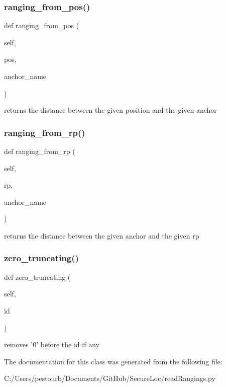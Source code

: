 \subsubsection{\texorpdfstring{ranging\+\_\+from\+\_\+pos()}{ranging\_from\_pos()}}
{\footnotesize\ttfamily def ranging\+\_\+from\+\_\+pos (\begin{DoxyParamCaption}\item[{}]{self,  }\item[{}]{pos,  }\item[{}]{anchor\+\_\+name }\end{DoxyParamCaption})}

\begin{DoxyVerb}returns the distance between the given position and the given anchor\end{DoxyVerb}
 \mbox{\label{classread_rangings_1_1_rangings_a3720c2eca68a86eb32876fad24d37b65}} 
\subsubsection{\texorpdfstring{ranging\+\_\+from\+\_\+rp()}{ranging\_from\_rp()}}
{\footnotesize\ttfamily def ranging\+\_\+from\+\_\+rp (\begin{DoxyParamCaption}\item[{}]{self,  }\item[{}]{rp,  }\item[{}]{anchor\+\_\+name }\end{DoxyParamCaption})}

\begin{DoxyVerb}returns the distance between the given anchor and the given rp\end{DoxyVerb}
 \mbox{\label{classread_rangings_1_1_rangings_a31dd1b70ec4bf449637fa2500a516f39}} 
\subsubsection{\texorpdfstring{zero\+\_\+truncating()}{zero\_truncating()}}
{\footnotesize\ttfamily def zero\+\_\+truncating (\begin{DoxyParamCaption}\item[{}]{self,  }\item[{}]{id }\end{DoxyParamCaption})}

\begin{DoxyVerb}removes '0' before the id if any\end{DoxyVerb}
 

The documentation for this class was generated from the following file\+:\begin{DoxyCompactItemize}
\item 
C\+:/\+Users/pestourb/\+Documents/\+Git\+Hub/\+Secure\+Loc/read\+Rangings.\+py\end{DoxyCompactItemize}

